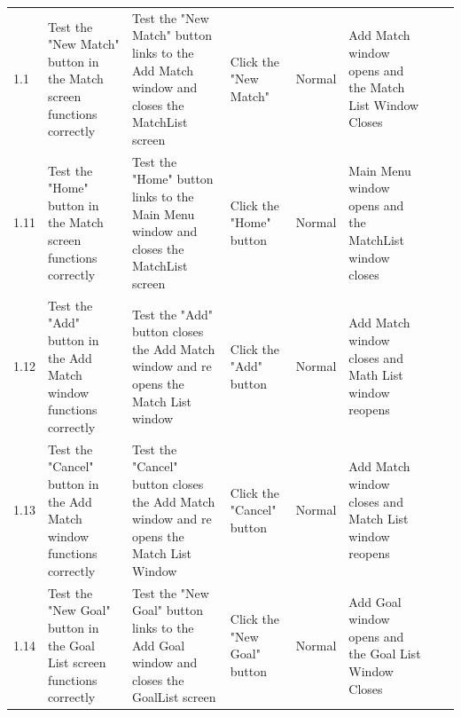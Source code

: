 \begin{table}[]
\begin{tabular}{llllllll}
		1.1                    & Test the "New Match" button in the Match screen functions correctly              & Test the "New Match" button links to the Add Match window and closes the MatchList screen                                 & Click the "New Match"                                                 & Normal                                                                  & Add Match window opens and the Match List Window Closes                                       &               &                      \\
		1.11                   & Test the "Home" button in the Match screen functions correctly                   & Test the "Home" button links to the Main Menu window and closes the MatchList screen                                      & Click the "Home" button                                               & Normal                                                                  & Main Menu window opens and the MatchList window closes                                        &               &                      \\
		1.12                   & Test the "Add" button in the Add Match window functions correctly                & Test the "Add" button closes the Add Match window and re opens the Match List window                                      & Click the "Add" button                                                & Normal                                                                  & Add Match window closes and Math List window reopens                                          &               &                      \\
		1.13                   & Test the "Cancel" button in the Add Match window functions correctly             & Test the "Cancel" button closes the Add Match window and re opens the Match List Window                                   & Click the "Cancel" button                                             & Normal                                                                  & Add Match window closes and Match List window reopens                                         &               &                      \\
		1.14                   & Test the "New Goal" button in the Goal List screen functions correctly           & Test the "New Goal" button links to the Add Goal window and closes the GoalList screen                                    & Click the "New Goal" button                                           & Normal                                                                  & Add Goal window opens and the Goal List Window Closes                                         &               &                      \\

\end{tabular}
\end{table}

